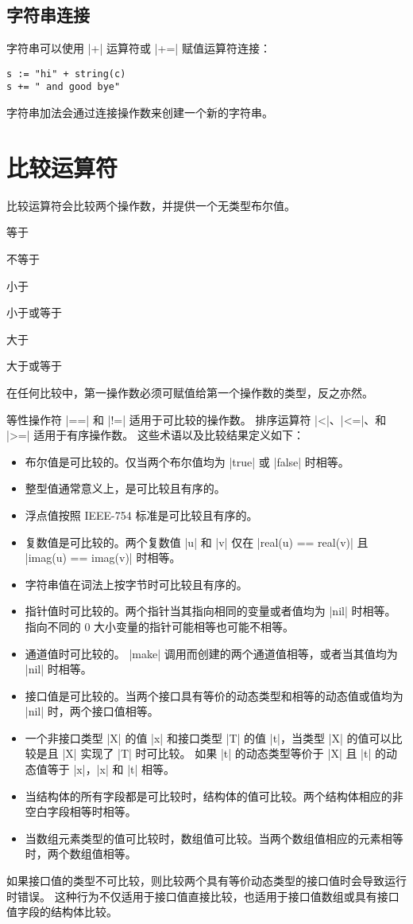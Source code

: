 \subsection{字符串连接}
字符串可以使用 \code|+| 运算符或 \code|+=| 赋值运算符连接：
\begin{lstlisting}[style=golang]
s := "hi" + string(c)
s += " and good bye"
\end{lstlisting}
字符串加法会通过连接操作数来创建一个新的字符串。

\section{比较运算符}
比较运算符会比较两个操作数，并提供一个无类型布尔值。
\begin{description}[style=sameline, leftmargin=2\parindent]
\item[==] 等于
\item[!=] 不等于
\item[<] 小于
\item[<=] 小于或等于
\item[>] 大于
\item[>=] 大于或等于
\end{description}
在任何比较中，第一操作数必须可赋值给第一个操作数的类型，反之亦然。

等性操作符 \code|==| 和 \code|!=| 适用于可比较的操作数。
排序运算符 \code|<|、\code|<=|、和 \code|>=| 适用于有序操作数。
这些术语以及比较结果定义如下：
\begin{itemize}
\item 布尔值是可比较的。仅当两个布尔值均为 \code|true| 或 \code|false| 时相等。
\item 整型值通常意义上，是可比较且有序的。
\item 浮点值按照 IEEE-754 标准是可比较且有序的。
\item 复数值是可比较的。两个复数值 \code|u| 和 \code|v| 仅在 \code|real(u) == real(v)| 且 \code|imag(u) == imag(v)| 时相等。
\item 字符串值在词法上按字节时可比较且有序的。
\item 指针值时可比较的。两个指针当其指向相同的变量或者值均为 \code|nil| 时相等。
指向不同的 0 大小变量的指针可能相等也可能不相等。
\item 通道值时可比较的。 \code|make| 调用而创建的两个通道值相等，或者当其值均为 \code|nil| 时相等。
\item 接口值是可比较的。当两个接口具有等价的动态类型和相等的动态值或值均为 \code|nil| 时，两个接口值相等。
\item  一个非接口类型 \code|X| 的值 \code|x| 和接口类型 \code|T| 的值 \code|t|，当类型 \code|X| 的值可以比较是且 \code|X| 实现了 \code|T| 时可比较。
如果 \code|t| 的动态类型等价于 \code|X| 且 \code|t| 的动态值等于 \code|x|，\code|x| 和 \code|t| 相等。
\item 当结构体的所有字段都是可比较时，结构体的值可比较。两个结构体相应的非空白字段相等时相等。
\item 当数组元素类型的值可比较时，数组值可比较。当两个数组值相应的元素相等时，两个数组值相等。
\end{itemize}
如果接口值的类型不可比较，则比较两个具有等价动态类型的接口值时会导致运行时错误。
这种行为不仅适用于接口值直接比较，也适用于接口值数组或具有接口值字段的结构体比较。

